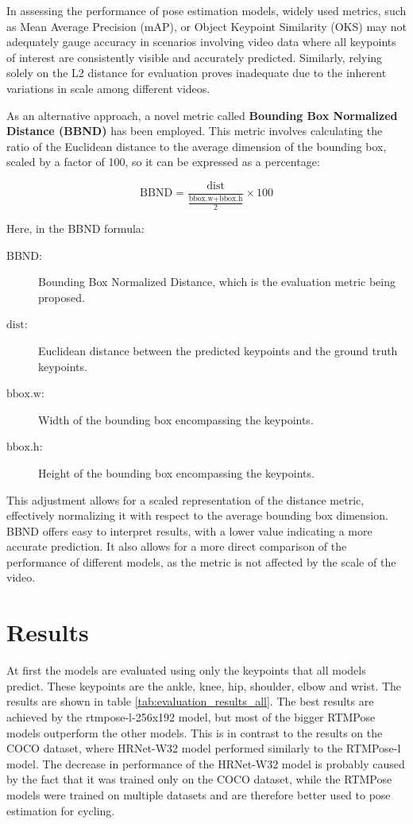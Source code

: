 In assessing the performance of pose estimation models, widely used metrics, such as Mean Average Precision (mAP), or Object Keypoint Similarity (OKS) may not adequately gauge accuracy in scenarios involving video data where all keypoints of interest are consistently visible and accurately predicted. Similarly, relying solely on the L2 distance for evaluation proves inadequate due to the inherent variations in scale among different videos.

As an alternative approach, a novel metric called \textbf{Bounding Box Normalized Distance (BBND)} has been employed. This metric involves calculating the ratio of the Euclidean distance to the average dimension of the bounding box, scaled by a factor of 100, so it can be expressed as a percentage:

$$ \text{BBND} = \frac{\text{dist}}{\frac{\text{bbox.w} + \text{bbox.h}}{2}} \times 100 $$

Here, in the BBND formula:
\begin{description}
    \item[$\text{BBND}$:] Bounding Box Normalized Distance, which is the evaluation metric being proposed.
    \item[$\text{dist}$:] Euclidean distance between the predicted keypoints and the ground truth keypoints.
    \item[$\text{bbox.w}$:] Width of the bounding box encompassing the keypoints.
    \item[$\text{bbox.h}$:] Height of the bounding box encompassing the keypoints.
\end{description}

This adjustment allows for a scaled representation of the distance metric, effectively normalizing it with respect to the average bounding box dimension. BBND offers easy to interpret results, with a lower value indicating a more accurate prediction. It also allows for a more direct comparison of the performance of different models, as the metric is not affected by the scale of the video.

\section{Results}
\label{evaluation_results}
At first the models are evaluated using only the keypoints that all models predict. These keypoints are the ankle, knee, hip, shoulder, elbow and wrist. The results are shown in table \ref{tab:evaluation_results_all}. The best results are achieved by the rtmpose-l-256x192 model, but most of the bigger RTMPose models outperform the other models. This is in contrast to the results on the COCO dataset, where HRNet-W32 model performed similarly to the RTMPose-l model. The decrease in performance of the HRNet-W32 model is probably caused by the fact that it was trained only on the COCO dataset, while the RTMPose models were trained on multiple datasets and are therefore better used to pose estimation for cycling.

